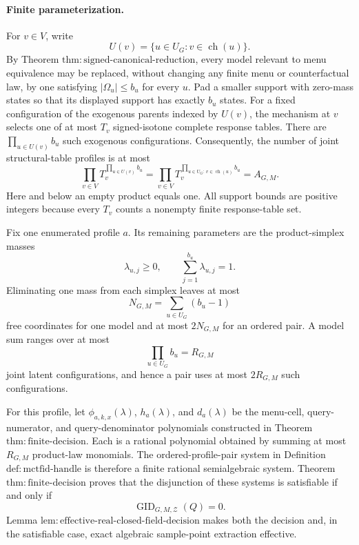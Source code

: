 \paragraph{Finite parameterization.}
For \(v\in V\), write
\[
 U(v)=\{u\in U_G:v\in\operatorname{ch}(u)\}.
\]
By Theorem \(\mathrm{thm:signed\text{-}canonical\text{-}reduction}\), every model relevant to menu equivalence may be replaced, without changing any finite menu or counterfactual law, by one satisfying \(|\Omega_u|\le b_u\) for every \(u\).  Pad a smaller support with zero-mass states so that its displayed support has exactly \(b_u\) states.  For a fixed configuration of the exogenous parents indexed by \(U(v)\), the mechanism at \(v\) selects one of at most \(T_v\) signed-isotone complete response tables.  There are \(\prod_{u\in U(v)}b_u\) such exogenous configurations.  Consequently, the number of joint structural-table profiles is at most
\[
 \prod_{v\in V}T_v^{\prod_{u\in U(v)}b_u}
 =\prod_{v\in V}T_v^{\prod_{u\in U_G:\,v\in\operatorname{ch}(u)}b_u}
 =A_{G,M}.
\]
Here and below an empty product equals one.  All support bounds are positive integers because every \(T_v\) counts a nonempty finite response-table set.

Fix one enumerated profile \(a\).  Its remaining parameters are the product-simplex masses
\[
 \lambda_{u,j}\ge 0,
 \qquad
 \sum_{j=1}^{b_u}\lambda_{u,j}=1.
\]
Eliminating one mass from each simplex leaves at most
\[
 N_{G,M}=\sum_{u\in U_G}(b_u-1)
\]
free coordinates for one model and at most \(2N_{G,M}\) for an ordered pair.  A model sum ranges over at most
\[
 \prod_{u\in U_G}b_u=R_{G,M}
\]
joint latent configurations, and hence a pair uses at most \(2R_{G,M}\) such configurations.

For this profile, let \(\phi_{a,k,x}(\lambda)\), \(h_a(\lambda)\), and \(d_a(\lambda)\) be the menu-cell, query-numerator, and query-denominator polynomials constructed in Theorem \(\mathrm{thm:finite\text{-}decision}\).  Each is a rational polynomial obtained by summing at most \(R_{G,M}\) product-law monomials.  The ordered-profile-pair system in Definition \(\mathrm{def:mctfid\text{-}handle}\) is therefore a finite rational semialgebraic system.  Theorem \(\mathrm{thm:finite\text{-}decision}\) proves that the disjunction of these systems is satisfiable if and only if
\[
 \operatorname{GID}_{G,M,\mathcal Z}(Q)=0.
\]
Lemma \(\mathrm{lem:effective\text{-}real\text{-}closed\text{-}field\text{-}decision}\) makes both the decision and, in the satisfiable case, exact algebraic sample-point extraction effective.

